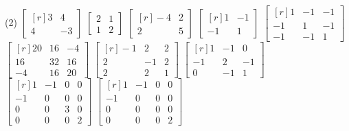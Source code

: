 \begin{tasks}[
    style=enumerate,
    label-offset = 3mm,
    start=44,
    ](2)
    \task $\begin{bmatrix*}[r]3 & 4 \\ 4 & -3\end{bmatrix*}$
    \task $\begin{bmatrix*}2 & 1 \\ 1 & 2\end{bmatrix*}$
    \task $\begin{bmatrix*}[r]-4 & 2 \\ 2 & 5\end{bmatrix*}$
    \task $\begin{bmatrix*}[r]1 & -1 \\ -1 & 1\end{bmatrix*}$
    \task $\begin{bmatrix*}[r]1 & -1 & -1 \\ -1 & 1 & -1 \\ -1 & -1 & 1\end{bmatrix*}$
    \task $\begin{bmatrix*}[r]20 & 16 & -4 \\ 16 & 32 & 16 \\ -4 & 16 & 20\end{bmatrix*}$
    \task $\begin{bmatrix*}[r]-1 & 2 & 2 \\ 2 & -1 & 2 \\ 2 & 2 & 1\end{bmatrix*}$
    \task $\begin{bmatrix*}[r]1 & -1 & 0 \\ -1 & 2 & -1 \\ 0 & -1 & 1\end{bmatrix*}$
    \task $\begin{bmatrix*}[r]1 & -1 & 0 & 0 \\ -1 & 0 & 0 & 0 \\ 0 & 0 & 3 & 0 \\ 0 & 0 & 0 & 2\end{bmatrix*}$
    \task $\begin{bmatrix*}[r]1 & -1 & 0 & 0 \\ -1 & 0 & 0 & 0 \\ 0 & 0 & 0 & 0 \\ 0 & 0 & 0 & 2\end{bmatrix*}$
\end{tasks}
